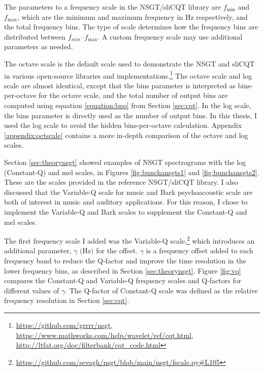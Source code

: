 \documentclass[report.tex]{subfiles}
\begin{document}
The parameters to a frequency scale in the NSGT/sliCQT library are $f_{\text{min}}$ and $f_{\text{max}}$, which are the minimum and maximum frequency in Hz respectively, and the total frequency bins. The type of scale determines how the frequency bins are distributed between $f_{min}$--$f_{\text{max}}$. A custom frequency scale may use additional parameters as needed.

The octave scale is the default scale used to demonstrate the NSGT and sliCQT \parencite{balazs, slicq} in various open-source libraries and implementations.\footnote{\url{https://github.com/grrrr/nsgt}, \url{https://www.mathworks.com/help/wavelet/ref/cqt.html}, \url{http://ltfat.org/doc/filterbank/cqt_code.html}} The octave scale and log scale are almost identical, except that the bins parameter is interpreted as bins-per-octave for the octave scale, and the total number of output bins are computed using equation \eqref{equation:bpo} from Section \ref{sec:cqt}. In the log scale, the bins parameter is directly used as the number of output bins. In this thesis, I used the log scale to avoid the hidden bins-per-octave calculation. Appendix \ref{appendix:octscale} contains a more in-depth comparison of the octave and log scales.

Section \ref{sec:theorynsgt} showed examples of NSGT spectrograms with the log (Constant-Q) and mel scales, in Figures \ref{fig:bunchansgts1} and \ref{fig:bunchansgts2}. These are the scales provided in the reference NSGT/sliCQT library. I also discussed that the Variable-Q scale for music and Bark psychoacoustic scale are both of interest in music and auditory applications. For this reason, I chose to implement the Variable-Q and Bark scales to supplement the Constant-Q and mel scales.

The first frequency scale I added was the Variable-Q scale,\footnote{\url{https://github.com/sevagh/nsgt/blob/main/nsgt/fscale.py\#L105}} which introduces an additional parameter, $\gamma \text{ (Hz)}$ for the offset. $\gamma$ is a frequency offset added to each frequency band to reduce the Q-factor and improve the time resolution in the lower frequency bins, as described in Section \ref{sec:theorynsgt}. Figure \ref{fig:vq} compares the Constant-Q and Variable-Q frequency scales and Q-factors for different values of $\gamma$. The Q-factor of Constant-Q scale was defined as the relative frequency resolution in Section \ref{sec:cqt}.
\end{document}
